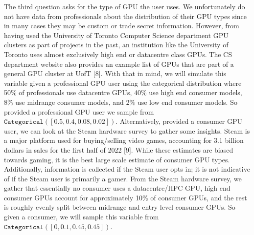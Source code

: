\documentclass[
]{article}
\begin{document}
The third question asks for the type of GPU the user uses. We
unfortunately do not have data from professionals about the distribution
of their GPU types since in many cases they may be custom or trade
secret information. However, from having used the University of Toronto
Computer Science department GPU clusters as part of projects in the
past, an institution like the University of Toronto uses almost
exclusively high end or datacentre class GPUs. The CS department website
also provides an example list of GPUs that are part of a general GPU
cluster at UofT {[}8{]}. With that in mind, we will simulate this
variable given a professional GPU user using the categorical
distribution where 50\% of professionals use datacentre GPUs, 40\% use
high end consumer models, 8\% use midrange consumer models, and 2\% use
low end consumer models. So provided a professional GPU user we sample
from \(\texttt{Categorical}([0.5, 0.4, 0.08, 0.02])\). Alternatively,
provided a consumer GPU user, we can look at the Steam hardware survey
to gather some insights. Steam is a major platform used for
buying/selling video games, accounting for 3.1 billion dollars in sales
for the first half of 2022 {[}9{]}. While these estimates are biased
towards gaming, it is the best large scale estimate of consumer GPU
types. Additionally, information is collected if the Steam user opts in;
it is not indicative of if the Steam user is primarily a gamer. From the
Steam hardware survey, we gather that essentially no consumer uses a
datacentre/HPC GPU, high end consumer GPUs account for approximately
10\% of consumer GPUs, and the rest is roughly evenly split between
midrange and entry level consumer GPUs. So given a consumer, we will
sample this variable from
\(\texttt{Categorical}([0, 0.1, 0.45, 0.45])\).
\end{document}
